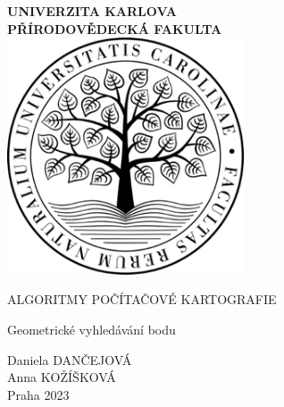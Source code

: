 \documentclass[11pt, a4paper]{report}
\begin{document}
\begin{titlepage}
    \centering
        {\bfseries\Large
            UNIVERZITA KARLOVA\\
            PŘÍRODOVĚDECKÁ FAKULTA\\
            \vskip2cm
        } 
        \vfill
             \includegraphics[width=7cm]{logo_natur} %
        \vfill
        {\bfseries\Large
            \vskip2cm
            {\Large ALGORITMY POČÍTAČOVÉ KARTOGRAFIE\par}
            \vskip0.3cm
            Geometrické vyhledávání bodu\\
            \vskip4.5cm
        }
\vfill
    {\large\raggedleft Daniela DANČEJOVÁ \\Anna KOŽÍŠKOVÁ \\Praha 2023\par} 
\vfill
\vfill
\end{titlepage}






\end{document}
